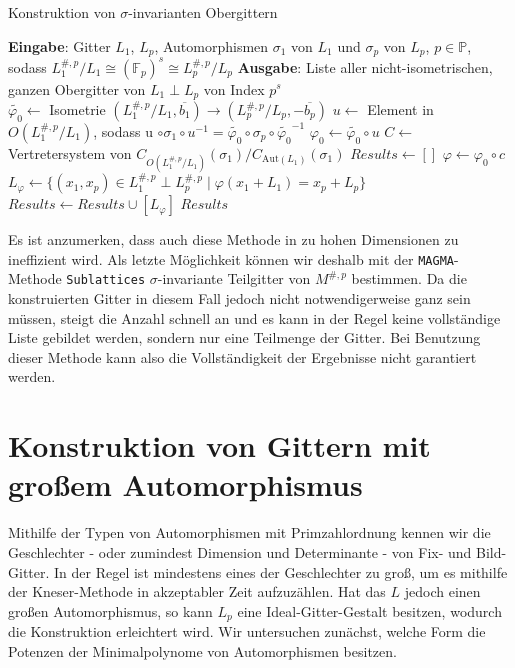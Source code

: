 \documentclass[12pt,a4paper,halfparskip,headsepline,bibtotocnumbered]{scrreprt}
\theoremstyle{nummermitklammern}
\theoremstyle{nonumberbreak}
\newcommand{\F}{\mathbb{F}}
\renewcommand{\P}{\mathbb{P}}
\begin{document}
\begin{algorithm}[H]
	\caption{Konstruktion von $\sigma$-invarianten Obergittern}\label{alg:superlat}
	\begin{algorithmic}[1]
		\State \textbf{Eingabe}: Gitter $L_1$, $L_p$, Automorphismen $\sigma_1$ von $L_1$ und $\sigma_p$ von $L_p$, $p \in \P$, sodass $L_1^{\#,p}/L_1 \cong (\F_p)^s \cong L_p^{\#,p}/L_p$
		\State \textbf{Ausgabe}: Liste aller nicht-isometrischen, ganzen Obergitter von $L_1 \perp L_p$ von Index $p^s$
		\\
		\State $\tilde{\varphi_0} \gets$ Isometrie $(L_1^{\#,p} / L_1, \overline{b_1}) \rightarrow (L_p^{\#,p} / L_p, -\overline{b_p})$
		\State $u \gets$ Element in $O(L_1^{\#,p}/L_1)$, sodass u $\circ \sigma_1 \circ u^{-1} = \tilde{\varphi_0} \circ \sigma_p \circ \tilde{\varphi_0}^{-1}$
		\State $\varphi_0 \gets \tilde{\varphi_0} \circ u$
		\State $C \gets$ Vertretersystem von $C_{O(L_1^{\#,p} / L_1)}(\sigma_1) / C_{\text{Aut}(L_1)}(\sigma_1)$
		\State $Results \gets []$
			\State $\varphi \gets \varphi_0 \circ c$
			\State $L_\varphi \gets \lbrace (x_1,x_p) \in L_1^{\#,p} \perp L_p^{\#,p} \mid \varphi(x_1+L_1) = x_p + L_p \rbrace$
				\State $Results \gets Results \cup [L_\varphi]$
			\EndIf
		\EndFor
		\State \Return $Results$
	\end{algorithmic}
\end{algorithm}
Es ist anzumerken, dass auch diese Methode in zu hohen Dimensionen zu ineffizient wird. Als letzte Möglichkeit können wir deshalb mit der \texttt{MAGMA}-Methode \texttt{Sublattices} $\sigma$-invariante Teilgitter von $M^{\#,p}$ bestimmen. Da die konstruierten Gitter in diesem Fall jedoch nicht notwendigerweise ganz sein müssen, steigt die Anzahl schnell an und es kann in der Regel keine vollständige Liste gebildet werden, sondern nur eine Teilmenge der Gitter. Bei Benutzung dieser Methode kann also die Vollständigkeit der Ergebnisse nicht garantiert werden.



\section{Konstruktion von Gittern mit großem Automorphismus}

Mithilfe der Typen von Automorphismen mit Primzahlordnung kennen wir die Geschlechter - oder zumindest Dimension und Determinante - von Fix- und Bild-Gitter. In der Regel ist mindestens eines der Geschlechter zu groß, um es mithilfe der Kneser-Methode in akzeptabler Zeit aufzuzählen. Hat das $L$ jedoch einen großen Automorphismus, so kann $L_p$ eine Ideal-Gitter-Gestalt besitzen, wodurch die Konstruktion erleichtert wird. Wir untersuchen zunächst, welche Form die Potenzen der Minimalpolynome von Automorphismen besitzen.
\end{document}
